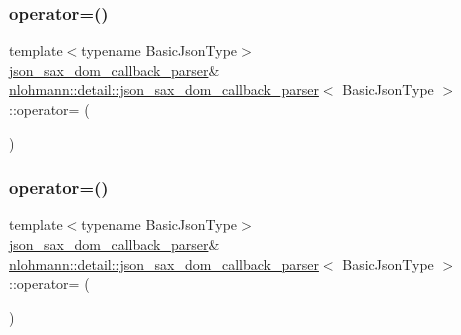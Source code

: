 \subsubsection{\texorpdfstring{operator=()}{operator=()}\hspace{0.1cm}{\footnotesize\ttfamily [1/2]}}
{\footnotesize\ttfamily template$<$typename Basic\+Json\+Type$>$ \\
\hyperlink{classnlohmann_1_1detail_1_1json__sax__dom__callback__parser}{json\+\_\+sax\+\_\+dom\+\_\+callback\+\_\+parser}\& \hyperlink{classnlohmann_1_1detail_1_1json__sax__dom__callback__parser}{nlohmann\+::detail\+::json\+\_\+sax\+\_\+dom\+\_\+callback\+\_\+parser}$<$ Basic\+Json\+Type $>$\+::operator= (\begin{DoxyParamCaption}\item[{const \hyperlink{classnlohmann_1_1detail_1_1json__sax__dom__callback__parser}{json\+\_\+sax\+\_\+dom\+\_\+callback\+\_\+parser}$<$ Basic\+Json\+Type $>$ \&}]{ }\end{DoxyParamCaption})\hspace{0.3cm}{\ttfamily [delete]}}

\mbox{\label{classnlohmann_1_1detail_1_1json__sax__dom__callback__parser_a60753ffbec958de15de807852e62cde8}} 
\subsubsection{\texorpdfstring{operator=()}{operator=()}\hspace{0.1cm}{\footnotesize\ttfamily [2/2]}}
{\footnotesize\ttfamily template$<$typename Basic\+Json\+Type$>$ \\
\hyperlink{classnlohmann_1_1detail_1_1json__sax__dom__callback__parser}{json\+\_\+sax\+\_\+dom\+\_\+callback\+\_\+parser}\& \hyperlink{classnlohmann_1_1detail_1_1json__sax__dom__callback__parser}{nlohmann\+::detail\+::json\+\_\+sax\+\_\+dom\+\_\+callback\+\_\+parser}$<$ Basic\+Json\+Type $>$\+::operator= (\begin{DoxyParamCaption}\item[{\hyperlink{classnlohmann_1_1detail_1_1json__sax__dom__callback__parser}{json\+\_\+sax\+\_\+dom\+\_\+callback\+\_\+parser}$<$ Basic\+Json\+Type $>$ \&\&}]{ }\end{DoxyParamCaption})\hspace{0.3cm}{\ttfamily [default]}}

